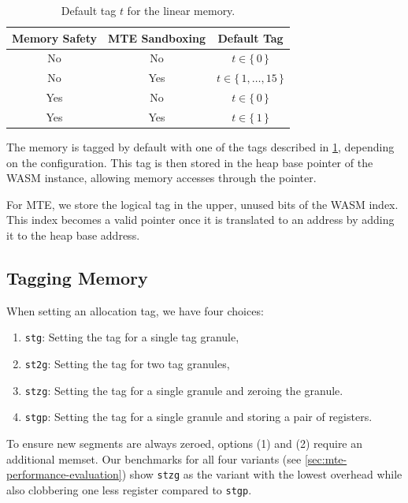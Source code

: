 \begin{table}
    \centering
    \caption{Default tag $t$ for the linear memory.}
    \label{tab:default-tag}
    \begin{tabular}{c | c || c}
        \textbf{Memory Safety} & \textbf{MTE Sandboxing} & \textbf{Default Tag}         \\
        \hline
        No                     & No                      & $t \in \{\,0\,\}$            \\
        No                     & Yes                     & $t \in \{\,1, \dots, 15\,\}$ \\
        Yes                    & No                      & $t \in \{\,0\,\}$            \\
        Yes                    & Yes                     & $t \in \{\,1\,\}$
    \end{tabular}
\end{table}

The memory is tagged by default with one of the tags described in \cref{tab:default-tag}, depending on the configuration.
This tag is then stored in the heap base pointer of the \ac{WASM} instance, allowing memory accesses through the pointer.

For \ac{MTE}, we store the logical tag in the upper, unused bits of the \ac{WASM} index.
This index becomes a valid pointer once it is translated to an address by adding it to the heap base address.

\subsection{Tagging Memory}
\label{subsec:tagging-memory}

When setting an allocation tag, we have four choices:
\begin{enumerate}
    \item \texttt{stg}: Setting the tag for a single tag granule,
    \item \texttt{st2g}: Setting the tag for two tag granules,
    \item \texttt{stzg}: Setting the tag for a single granule and zeroing the granule.
    \item \texttt{stgp}: Setting the tag for a single granule and storing a pair of registers.
\end{enumerate}

\noindent
To ensure new segments are always zeroed, options (1) and (2) require an additional memset.
Our benchmarks for all four variants (see \cref{sec:mte-performance-evaluation}) show \texttt{stzg} as the variant with the lowest overhead while also clobbering one less register compared to \texttt{stgp}.

